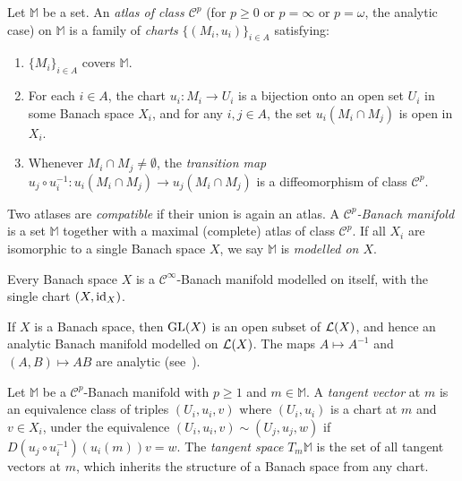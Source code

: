 \begin{definition}
\label{def:banach_manifold}
Let $\mathbb{M}$ be a set. An \emph{atlas of class $\mathcal{C}^p$}
(for $p \geq 0$ or $p = \infty$ or $p = \omega$, the analytic case)
on $\mathbb{M}$ is a family of \emph{charts}
$\{(M_i, u_i)\}_{i \in A}$ satisfying:
\begin{enumerate}
\item[\textup{(AT1)}] $\{M_i\}_{i\in A}$ covers $\mathbb{M}$.
\item[\textup{(AT2)}] For each $i \in A$, the chart $u_i: M_i \to U_i$
    is a bijection onto an open set $U_i$ in some Banach space $X_i$,
    and for any $i, j \in A$, the set $u_i(M_i \cap M_j)$ is open in $X_i$.
\item[\textup{(AT3)}] Whenever $M_i \cap M_j \neq \emptyset$,
    the \emph{transition map}
    $u_j \circ u_i^{-1} : u_i(M_i \cap M_j) \to u_j(M_i \cap M_j)$
    is a diffeomorphism of class $\mathcal{C}^p$.
\end{enumerate}
Two atlases are \emph{compatible} if their union is again an atlas. A
\emph{$\mathcal{C}^p$-Banach manifold} is a set $\mathbb{M}$ together
with a maximal (complete) atlas of class $\mathcal{C}^p$. If all
$X_i$ are isomorphic to a single Banach space $X$, we say $\mathbb{M}$
is \emph{modelled on $X$}.
\end{definition}

\begin{example}
\label{ex:manifold:banach_space}
Every Banach space $X$ is a $\mathcal{C}^\infty$-Banach manifold
modelled on itself, with the single chart $(X, \mathrm{id}_{X})$.
\end{example}

\begin{example}
\label{ex:manifold:GL}
If $X$ is a Banach space, then $\mathrm{GL}(X)$ is an open subset of $\mathcal{L}(X)$,
and hence an analytic Banach manifold modelled on $\mathcal{L}(X)$. The maps
$A \mapsto A^{-1}$ and $(A,B) \mapsto AB$ are analytic
\textup{(}see~\cite[2.7, 2.8]{Upmeier1985}\textup{)}.
\end{example}

\begin{definition}
\label{def:tangent_space}
Let $\mathbb{M}$ be a $\mathcal{C}^p$-Banach manifold with $p \geq 1$
and $m \in \mathbb{M}$. A \emph{tangent vector} at $m$ is an equivalence
class of triples $(U_i, u_i, v)$ where $(U_i, u_i)$ is a chart at $m$
and $v \in X_i$, under the equivalence
$(U_i, u_i, v) \sim (U_j, u_j, w)$ if $D(u_j \circ u_i^{-1})(u_i(m)) v = w$.
The \emph{tangent space} $T_m \mathbb{M}$ is the set of all tangent vectors
at $m$, which inherits the structure of a Banach space from any chart.
\end{definition}

